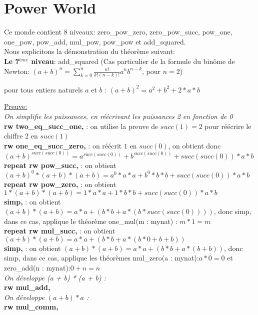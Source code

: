 \documentclass{article}
\begin{document}
\section{Power World}
Ce monde contient 8 niveaux: zero\_pow\_zero, zero\_pow\_succ, pow\_one, one\_pow, pow\_add, mul\_pow, pow\_pow et add\_squared.\\ 
Nous explicitons la démonstration du théorème suivant: \\
\textbf{Le 7$^{ème}$ niveau}: add\_squared (Cas particulier de la formule du binôme de Newton: $(a+b)^n=\sum_{k=0}^{n}{\frac{n!}{k!(n-k)!} a^nb^{n-k}}$, pour $n=2$)
\begin{center} pour tous entiers naturels $a$ et $b$ : $(a+b)^2=a^2+b^2+2*a*b $\end{center}
{\large\underline{Preuve:}}\\
 \textit{On simplifie les puissances, en réécrivant les puissances 2 en fonction de 0 }\\
  \textbf{rw two\_eq\_succ\_one,} : on utilise la preuve de $succ(1)=2$ pour réécrire le chiffre $2$ en $succ(1)$ \\
 \textbf{rw one\_eq\_succ\_zero,} :  on réécrit $1$ en $succ(0)$, on obtient donc $(a + b) ^ {succ (succ (0))} = a ^ {succ (succ (0)) }+ b ^ {succ (succ (0)) }+ succ (succ (0)) * a * b$\\
  \textbf{repeat {rw pow\_succ},} : on obtient $(a + b) ^ 0 * (a + b) * (a + b) = a ^ 0 * a * a + b ^ 0 * b * b + succ (succ (0)) * a * b$ \\
  \textbf{repeat {rw pow\_zero},} : on obtient $1 * (a + b) * (a + b) = 1 * a * a + 1 * b * b + succ (succ (0)) * a * b$\\
  \textbf{simp,} : on obtient $(a + b) * (a + b) = a * a + (b * b + a * (b * succ (succ (0))))
$, donc simp, dans ce cas, applique le théorème one\_mul(m : mynat) : $m * 1 = m$\\ 
  \textbf{repeat {rw mul\_succ},} : on obtient $(a + b) * (a + b) = a * a + (b * b + a * (b * 0 + b + b))$\\
  \textbf{simp,} : on obtient $(a + b) * (a + b) = a * a + (b * b + a * (b + b))$, donc simp, dans ce cas, applique les théorèmes mul\_zero(a : mynat):$a * 0 = 0$  et zero\_add(n : mynat):$0 + n = n$\\
  \textit{On développe (a + b) * (a + b) :} \\
 \textbf{rw mul\_add,} \\
 \textit{On développe $(a + b) * a$ :}\\
  \textbf{rw mul\_comm,} \\
\end{document}
